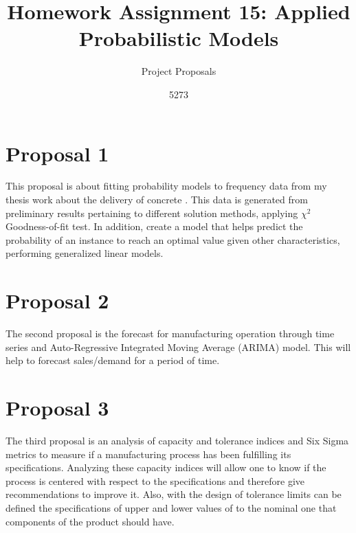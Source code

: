 \documentclass[10pt,leter,openany]{article}
\author{5273}
\title{Homework Assignment 15: Applied Probabilistic Models}
\subtitle{Project Proposals}
\date{}
\begin{document}
	
\maketitle

\section*{Proposal 1}
	This proposal is about fitting probability models to frequency data from my thesis work about the delivery of concrete \cite{hernandez2020study}. This data is generated from preliminary results pertaining to different solution methods, applying $\chi^{2}$ Goodness-of-fit test. In addition, create a model that helps predict the probability of an instance to reach an optimal value given other characteristics, performing generalized linear models.
	
\section*{Proposal 2}
	The second proposal is the forecast for manufacturing operation through time series and Auto-Regressive Integrated Moving Average (ARIMA) model. This will help to forecast sales/demand for a period of time.
		
\section*{Proposal 3}
	The third proposal is an analysis of capacity and tolerance indices and Six Sigma metrics to measure if a manufacturing process has been fulfilling its specifications. Analyzing these capacity indices will allow one to know if the process is centered with respect to the specifications and therefore give recommendations to improve it. Also, with the design of tolerance limits can be defined the specifications of upper and lower values of to the nominal one that components of the product should have.
		
		
			
\clearpage



	
\end{document}
